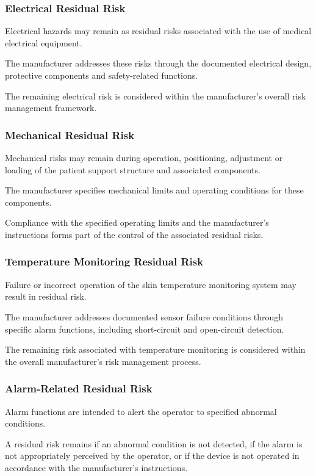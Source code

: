 \subsubsection{Electrical Residual Risk}

Electrical hazards may remain as residual risks associated with the use of
medical electrical equipment.

The manufacturer addresses these risks through the documented electrical
design, protective components and safety-related functions.

The remaining electrical risk is considered within the manufacturer's
overall risk management framework.

\subsubsection{Mechanical Residual Risk}

Mechanical risks may remain during operation, positioning, adjustment or
loading of the patient support structure and associated components.

The manufacturer specifies mechanical limits and operating conditions for
these components.

Compliance with the specified operating limits and the manufacturer's
instructions forms part of the control of the associated residual risks.

\subsubsection{Temperature Monitoring Residual Risk}

Failure or incorrect operation of the skin temperature monitoring system may
result in residual risk.

The manufacturer addresses documented sensor failure conditions through
specific alarm functions, including short-circuit and open-circuit
detection.

The remaining risk associated with temperature monitoring is considered
within the overall manufacturer's risk management process.

\subsubsection{Alarm-Related Residual Risk}

Alarm functions are intended to alert the operator to specified abnormal
conditions.

A residual risk remains if an abnormal condition is not detected, if the
alarm is not appropriately perceived by the operator, or if the device is
not operated in accordance with the manufacturer's instructions.

